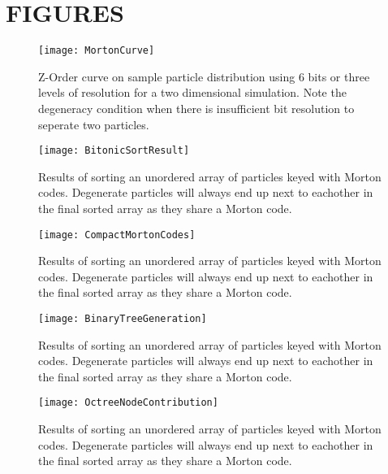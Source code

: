 \documentclass{thesis}
\begin{document}
\chapter{FIGURES}
\begin{figure}[h]
    \caption{Z-Order curve on sample particle distribution using 6 bits or three levels of resolution for a two dimensional simulation.  Note the degeneracy condition when there is insufficient bit resolution to seperate two particles.}
    \label{fig:MortonCurve}
    \centering
    \texttt{[image: MortonCurve]}
\end{figure}
\clearpage
\begin{figure}[h]
    \caption{Results of sorting an unordered array of particles keyed with  Morton codes. Degenerate particles will always end up next to eachother in the final sorted array as they share a  Morton code.}
    \label{fig:BitonicSortResult}
    \centering
    \texttt{[image: BitonicSortResult]}
\end{figure}
\clearpage
\begin{sidewaysfigure}[h]
    \label{fig:CompactMortonCodes}
    \centering
    \texttt{[image: CompactMortonCodes]}
    \caption{Results of sorting an unordered array of particles keyed with  Morton codes. Degenerate particles will always end up next to eachother in the final sorted array as they share a  Morton code.}
\end{sidewaysfigure}
\clearpage
\begin{sidewaysfigure}[h]
    \label{fig:BinaryTreeGeneration}
    \centering
    \texttt{[image: BinaryTreeGeneration]}
    \caption{Results of sorting an unordered array of particles keyed with  Morton codes. Degenerate particles will always end up next to eachother in the final sorted array as they share a  Morton code.}
\end{sidewaysfigure}
\clearpage
\begin{sidewaysfigure}[h]
    \label{fig:OctreeNodeContribution}
    \centering
    \texttt{[image: OctreeNodeContribution]}
    \caption{Results of sorting an unordered array of particles keyed with  Morton codes. Degenerate particles will always end up next to eachother in the final sorted array as they share a  Morton code.}
\end{sidewaysfigure}
\end{document}

